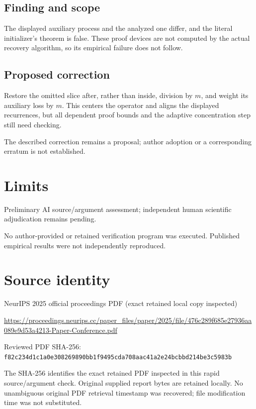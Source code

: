 \documentclass[11pt]{article}
\begin{document}
\subsection*{Finding and scope}

The displayed auxiliary process and the analyzed one differ, and the literal initializer’s theorem is false. These proof devices are not computed by the actual recovery algorithm, so its empirical failure does not follow.

\subsection*{Proposed correction}

Restore the omitted slice after, rather than inside, division by \(m\), and weight its auxiliary loss by \(m\). This centers the operator and aligns the displayed recurrences, but all dependent proof bounds and the adaptive concentration step still need checking.

The described correction remains a proposal; author adoption or a corresponding erratum is not established.

\section*{Limits}

Preliminary AI source/argument assessment; independent human scientific adjudication remains pending.\par

No author-provided or retained verification program was executed. Published empirical results were not independently reproduced.\par

\section*{Source identity}

NeurIPS 2025 official proceedings PDF (exact retained local copy inspected)

\url{https://proceedings.neurips.cc/paper_files/paper/2025/file/476c289f685e27936aa089e9d53a4213-Paper-Conference.pdf}

Reviewed PDF SHA-256: \nolinkurl{f82c234d1c1a0e308269890bb1f9495cda708aac41a2e24bcbbd214be3c5983b}

The SHA-256 identifies the exact retained PDF inspected in this rapid source/argument check. Original supplied report bytes are retained locally. No unambiguous original PDF retrieval timestamp was recovered; file modification time was not substituted.
\end{document}
